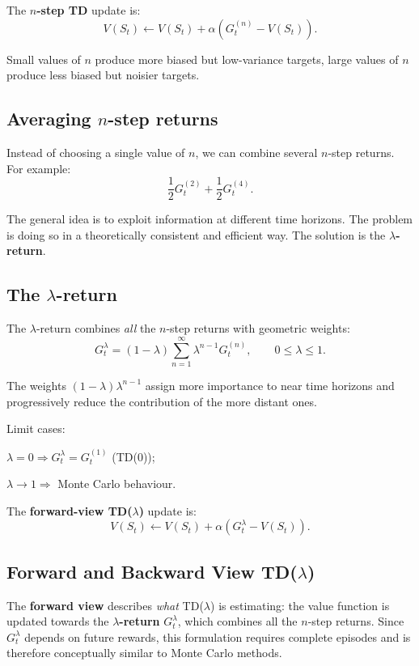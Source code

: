 The \textbf{$n$-step TD} update is:
\[
V(S_t) \leftarrow V(S_t) + \alpha \left(G_t^{(n)} - V(S_t)\right).
\]

Small values of $n$ produce more biased but low-variance targets,
large values of $n$ produce less biased but noisier targets.

\subsection{Averaging $n$-step returns}

Instead of choosing a single value of $n$, we can combine several $n$-step returns.
For example:
\[
\frac{1}{2} G_t^{(2)} + \frac{1}{2} G_t^{(4)}.
\]

The general idea is to exploit information at different time horizons.
The problem is doing so in a theoretically consistent and efficient way.
The solution is the \textbf{$\lambda$-return}.

\subsection{The $\lambda$-return}

The $\lambda$-return combines \emph{all} the $n$-step returns with geometric weights:
\[
G_t^\lambda
=
(1 - \lambda)\sum_{n=1}^{\infty} \lambda^{n-1} G_t^{(n)},
\qquad 0 \le \lambda \le 1.
\]

The weights $(1-\lambda)\lambda^{n-1}$ assign more importance to near time horizons
and progressively reduce the contribution of the more distant ones.

Limit cases:
\begin{compactitemize}
    \item $\lambda = 0 \Rightarrow G_t^\lambda = G_t^{(1)}$ (TD(0));
    \item $\lambda \rightarrow 1 \Rightarrow$ Monte Carlo behaviour.
\end{compactitemize}

The \textbf{forward-view TD($\lambda$)} update is:
\[
V(S_t) \leftarrow V(S_t) + \alpha \left(G_t^\lambda - V(S_t)\right).
\]

\subsection{Forward and Backward View TD($\lambda$)}

The \textbf{forward view} describes \emph{what} TD($\lambda$) is estimating: the value function is
updated towards the \textbf{$\lambda$-return} $G_t^\lambda$, which combines all the $n$-step returns.
Since $G_t^\lambda$ depends on future rewards, this formulation requires complete episodes and is
therefore conceptually similar to Monte Carlo methods.

